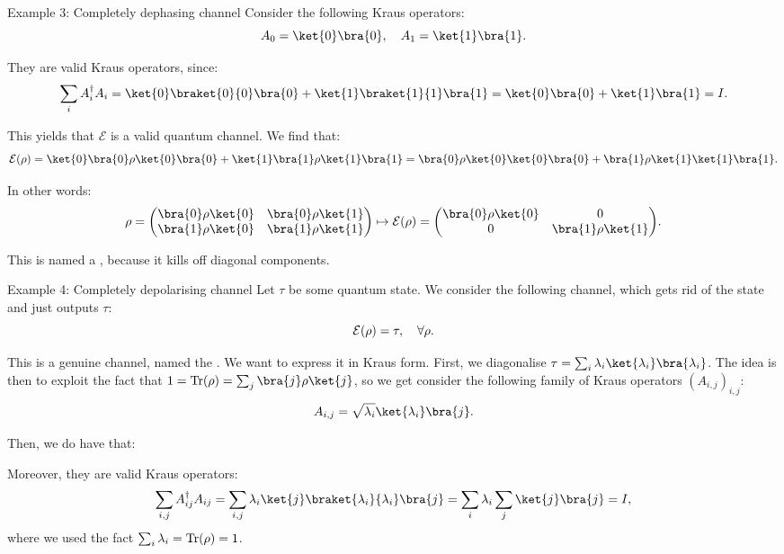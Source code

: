 \documentclass[a4paper]{article}
\begin{document}
\begin{parag}{Example 3: Completely dephasing channel}
    Consider the following Kraus operators: 
    \[A_0 = \ket{0}\bra{0}, \mathspace A_1 = \ket{1}\bra{1}.\]

    They are valid Kraus operators, since:
    \[\sum_{i} A_i^{\dagger} A_i = \ket{0} \braket{0}{0} \bra{0} + \ket{1} \braket{1}{1} \bra{1} = \ket{0}\bra{0} + \ket{1}\bra{1} = I.\]

    This yields that $\mathcal{E}$ is a valid quantum channel. We find that: 
    \[\mathcal{E}\left(\rho\right) = \ket{0} \bra{0} \rho \ket{0}\bra{0} + \ket{1}\bra{1} \rho \ket{1}\bra{1} = \bra{0} \rho \ket{0} \ket{0}\bra{0} + \bra{1} \rho \ket{1} \ket{1}\bra{1}.\]

    In other words: 
    \[\rho = \begin{pmatrix} \bra{0} \rho \ket{0} & \bra{0} \rho \ket{1} \\ \bra{1} \rho \ket{0} & \bra{1} \rho \ket{1} \end{pmatrix} \mapsto \mathcal{E}\left(\rho\right) = \begin{pmatrix} \bra{0} \rho \ket{0} & 0 \\ 0 & \bra{1} \rho \ket{1} \end{pmatrix}.\]

    This is named a , because it kills off diagonal components.
\end{parag}

\begin{parag}{Example 4: Completely depolarising channel}
    Let $\tau$ be some quantum state. We consider the following channel, which gets rid of the state and just outputs $\tau$: 
    \[\mathcal{E}\left(\rho\right) = \tau, \mathspace \forall \rho.\]

    This is a genuine channel, named the . We want to express it in Kraus form. First, we diagonalise $\tau = \sum_{i} \lambda_i \ket{\lambda_i}\bra{\lambda_i}$. The idea is then to exploit the fact that $1 = \Tr\left(\rho\right) = \sum_{j} \bra{j} \rho \ket{j}$, so we get consider the following family of Kraus operators $\left(A_{i, j}\right)_{i, j}$: 
    \[A_{i,j} = \sqrt{\lambda_i} \ket{\lambda_i}\bra{j}.\]
    
    Then, we do have that: 

    Moreover, they are valid Kraus operators: 
    \[\sum_{i, j} A_{ij}^{\dagger} A_{ij} = \sum_{i, j} \lambda_i \ket{j} \braket{\lambda_i}{\lambda_i} \bra{j} = \sum_{i} \lambda_i \sum_{j} \ket{j}\bra{j} = I,\]
    where we used the fact $\sum_{i} \lambda_i = \Tr\left(\rho\right) = 1$.
\end{parag}
\end{document}
